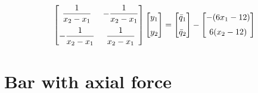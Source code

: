 \documentclass[letterpaper,10pt]{article}
\begin{document}
\begin{equation}
\begin{bmatrix}
\displaystyle
\frac{1}{x_2-x_1} &
\displaystyle
-\frac{1}{x_2-x_1}\vspace{2mm} \\
\displaystyle
-\frac{1}{x_2-x_1} &
\displaystyle
\frac{1}{x_2-x_1}
\end{bmatrix}
\begin{bmatrix}
y_1 \vspace{2mm}\\
y_2
\end{bmatrix}
=
\begin{bmatrix}
\displaystyle
\bar{q}_1 \vspace{2mm}\\
\displaystyle
\bar{q}_2
\end{bmatrix}
-
\begin{bmatrix}
\displaystyle
-(6x_1-12) \vspace{2mm}\\
\displaystyle
6(x_2 - 12)
\end{bmatrix}
\end{equation}

\section{Bar with axial force}
\end{document}
